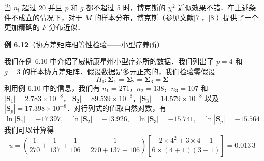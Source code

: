 当 $n_l$ 超过 20 并且 $p$ 和 $g$ 都不超过 5 时，博克斯的 $\chi^2$ 近似效果不错．在上述条件不成立的情况下，对于 $M$ 的样本分布，博克斯（参见文献[7]，[8]）提供了一个更加精确的 $F$ 分布近似．

\noindent\textbf{例 6.12}\quad （协方差矩阵相等性检验——小型疗养所）

我们在例 6.10 中介绍了威斯康星州小型疗养所的数据．我们列出了 $p=4$ 和 $g=3$ 的样本协方差矩阵．假设数据是多元正态的，我们检验零假设
\[
H_0:\boldsymbol{\Sigma}_1=\boldsymbol{\Sigma}_2=\boldsymbol{\Sigma}_3=\boldsymbol{\Sigma}
\]
利用例 6.10 中的信息，我们有 $n_1=271$，$n_2=138$，$n_3=107$ 和 $|\mathbf{S}_1|=2.783\times10^{-8}$，$|\mathbf{S}_2|=89.539\times10^{-8}$，$|\mathbf{S}_3|=14.579\times10^{-8}$ 以及 $|\mathbf{S}_p|=17.398\times10^{-8}$．对行列式的值取自然对数，有
\[
\ln|\mathbf{S}_1|=-17.397,\quad \ln|\mathbf{S}_2|=-13.926,\quad \ln|\mathbf{S}_3|=-15.741,\quad \ln|\mathbf{S}_p|=-15.564
\]
我们可以计算得
\[
u=\left(\frac{1}{270}+\frac{1}{137}+\frac{1}{106}-\frac{1}{270+137+106}\right)\left[\frac{2\times4^2+3\times4-1}{6\times(4+1)(3-1)}\right]=0.013\,3
\]
